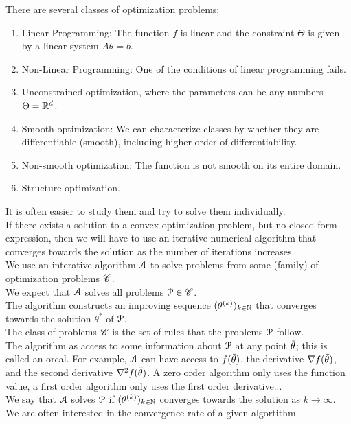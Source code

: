 \documentclass[12pt]{article}
\begin{document}
There are several classes of optimization problems:
\begin{enumerate}
    \item Linear Programming: The function $f$
    is linear and the constraint $\Theta$
    is given by a linear system $A\theta = b$.
    \item Non-Linear Programming: One of the conditions
    of linear programming fails.
    \item Unconstrained optimization, where the parameters
    can be any numbers $\Theta = \mathbb{R}^d$. 
    \item Smooth optimization: We can characterize classes
    by whether they are differentiable (smooth),
    including higher order of differentiability.
    \item Non-smooth optimization: The function is not
    smooth on its entire domain.
    \item Structure optimization.
\end{enumerate}
It is often easier to study them and try to solve them
individually. \\

If there exists a solution to a convex optimization
problem, but no closed-form expression,
then we will have to use an iterative numerical algorithm
that converges towards the solution as the number of
iterations increases. \\

We use an interative algorithm $\mathcal{A}$
to solve problems from some 
(family) of optimization problems $\mathscr{C}$. \\
We expect that $\mathcal{A}$ solves all problems $\mathcal{P} \in \mathscr{C}$. \\
The algorithm constructs an improving sequence
$(\theta^{(k)})_{k \in \mathbb{N}}$ that converges towards
the solution $\theta^*$ of $\mathcal{P}$. \\
The class of problems $\mathscr{C}$ is the set of rules
that the problems $\mathcal{P}$ follow. \\
The algorithm as access to some information about $\mathcal{P}$
at any point $\,\overline{\!{\theta}}$;
this is called an orcal. For example,
$\mathcal{A}$ can have access to $f(\,\overline{\!{\theta}})$,
the derivative $\nabla f(\,\overline{\!{\theta}})$,
and the second derivative $\nabla^2 f(\,\overline{\!{\theta}})$.
A zero order algorithm only uses the function value, 
a first order algorithm only uses the first order
derivative... \\

We say that $\mathcal{A}$ solves $\mathcal{P}$ 
if $(\theta^{(k)})_{k \in \mathbb{N}}$
converges towards the solution as $k \to \infty$. \\
We are often interested in the convergence rate
of a given algortithm. \\
\end{document}
